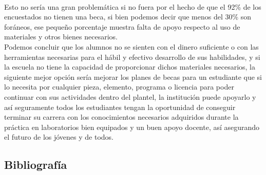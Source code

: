 \documentclass[letterpaper,12pt]{article}
\begin{document}
\begin{sloppypar}
\vspace{0.3cm}\\
Esto no sería una gran problemática si no fuera por el hecho de que el 92\% de los encuestados no tienen una beca, si bien podemos decir que menos del 30\% son foráneos, ese pequeño porcentaje muestra falta de apoyo respecto al uso de materiales y otros bienes necesarios. 
\vspace{0.3cm}\\
Podemos concluir que los alumnos no se sienten con el dinero suficiente o con las herramientas necesarias para el hábil y efectivo desarrollo de sus habilidades, y si la escuela no tiene la capacidad de proporcionar dichos materiales necesarios, la siguiente mejor opción sería mejorar los planes de becas para un estudiante que si lo necesita por cualquier pieza, elemento, programa o licencia para poder continuar con sus actividades dentro del plantel, la institución puede apoyarlo y así seguramente todos los estudiantes tengan la oportunidad de conseguir terminar su carrera con los conocimientos necesarios adquiridos durante la práctica en laboratorios bien equipados y un buen apoyo docente, así asegurando el futuro de los jóvenes y de todos.


\newpage
\begin{center}
    \section*{Bibliografía}
\end{center}



    


\end{sloppypar}
\end{document}

